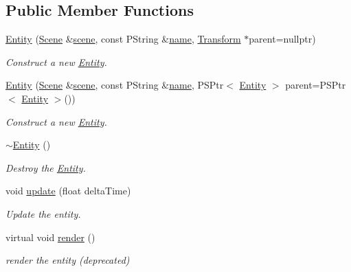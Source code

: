 \subsection*{Public Member Functions}
\begin{DoxyCompactItemize}
\item 
\mbox{\hyperlink{classprz_1_1_entity_a3a2ee329c4db0ab431c318213c79f5f4}{Entity}} (\mbox{\hyperlink{classprz_1_1_scene}{Scene}} \&\mbox{\hyperlink{classprz_1_1_entity_abc93c872fbda2dff6c205a8aeac9d96e}{scene}}, const P\+String \&\mbox{\hyperlink{classprz_1_1_entity_a3dcb8ce07126711bf90f3272b293d980}{name}}, \mbox{\hyperlink{classprz_1_1_transform}{Transform}} $\ast$parent=nullptr)
\begin{DoxyCompactList}\small\item\em Construct a new \mbox{\hyperlink{classprz_1_1_entity}{Entity}}. \end{DoxyCompactList}\item 
\mbox{\hyperlink{classprz_1_1_entity_adcc5c23fcdbe9a5413877af8f19390f1}{Entity}} (\mbox{\hyperlink{classprz_1_1_scene}{Scene}} \&\mbox{\hyperlink{classprz_1_1_entity_abc93c872fbda2dff6c205a8aeac9d96e}{scene}}, const P\+String \&\mbox{\hyperlink{classprz_1_1_entity_a3dcb8ce07126711bf90f3272b293d980}{name}}, P\+S\+Ptr$<$ \mbox{\hyperlink{classprz_1_1_entity}{Entity}} $>$ parent=P\+S\+Ptr$<$ \mbox{\hyperlink{classprz_1_1_entity}{Entity}} $>$())
\begin{DoxyCompactList}\small\item\em Construct a new \mbox{\hyperlink{classprz_1_1_entity}{Entity}}. \end{DoxyCompactList}\item 
\mbox{\hyperlink{classprz_1_1_entity_aa50e2bc561f809dea2a5e5e66ae93a8b}{$\sim$\+Entity}} ()
\begin{DoxyCompactList}\small\item\em Destroy the \mbox{\hyperlink{classprz_1_1_entity}{Entity}}. \end{DoxyCompactList}\item 
void \mbox{\hyperlink{classprz_1_1_entity_ac164eed5997d84d42014b6cb8fcc09c0}{update}} (float delta\+Time)
\begin{DoxyCompactList}\small\item\em Update the entity. \end{DoxyCompactList}\item 
virtual void \mbox{\hyperlink{classprz_1_1_entity_a3ad5dd16209c48164624522f99a2d418}{render}} ()
\begin{DoxyCompactList}\small\item\em render the entity (deprecated) \end{DoxyCompactList}\item 

\end{DoxyCompactItemize}
